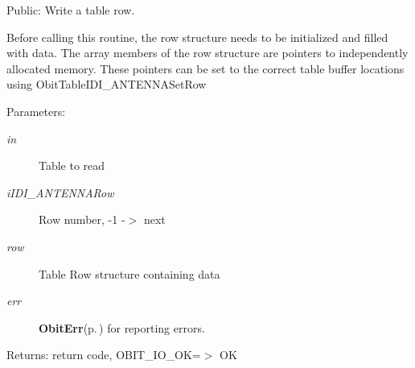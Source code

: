 Public: Write a table row. 

Before calling this routine, the row structure needs to be initialized and filled with data. The array members of the row structure are pointers to independently allocated memory. These pointers can be set to the correct table buffer locations using Obit\-Table\-IDI\_\-ANTENNASet\-Row \begin{Desc}
\item[Parameters:]
\begin{description}
\item[{\em in}]Table to read \item[{\em i\-IDI\_\-ANTENNARow}]Row number, -1 -$>$ next \item[{\em row}]Table Row structure containing data \item[{\em err}]{\bf Obit\-Err}{\rm (p.\,\pageref{structObitErr})} for reporting errors. \end{description}
\end{Desc}
\begin{Desc}
\item[Returns:]return code, OBIT\_\-IO\_\-OK=$>$ OK \end{Desc}
